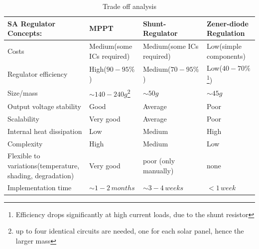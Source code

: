 \begin{table}[H]
\centering
{}
\caption{Trade off analysis}
\label{tab:TradeOff}
\begin{minipage}{\textwidth}
\centering
\begin{tabular}{||p{}p{}p{}p{}||}
\hline
\textbf{SA Regulator Concepts:} &  \textbf{MPPT} & \textbf{Shunt-Regulator} & \textbf{Zener-diode Regulation}\\ 
\hline
Costs & Medium(some ICs required) & Medium(some ICs required) & Low(simple components)\\
Regulator efficiency & High($90-95\%$) & Medium($70-95\%$) & Low($40-70\%$\footnote{Efficiency drops significantly at high current loads, due to the shunt resistor})\\
Size/mass & $\sim140-240 g$\footnote{up to four identical circuits are needed, one for each solar panel, hence the larger mass} & $\sim50 g$ & $\sim45 g$\\
Output voltage stability & Good & Average & Poor\\
Scalability & Very good & Average & Poor\\
Internal heat dissipation & Low & Medium & High\\
Complexity & High & Medium & Low\\
Flexible to variations(temperature, shading, degradation) & Very good & poor (only manually) & none\\
Implementation time & $\sim1-2\,months$ & $\sim3-4\,weeks$ & $< 1\,week$\\
\hline
\end{tabular}\par
\vspace{-0.75\skip\footins}
\renewcommand{\footnoterule}{}
\end{minipage}
\end{table}
%
